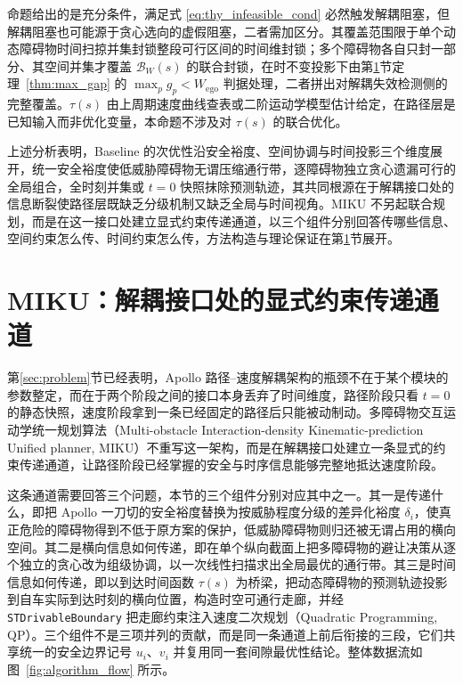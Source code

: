 \documentclass[a4paper,zihao=5]{ctexart}
\theoremstyle{definition}
\begin{document}
命题给出的是充分条件，满足式 \eqref{eq:thy_infeasible_cond} 必然触发解耦阻塞，但解耦阻塞也可能源于贪心选向的虚假阻塞，二者需加区分。其覆盖范围限于单个动态障碍物时间扫掠并集封锁整段可行区间的时间维封锁；多个障碍物各自只封一部分、其空间并集才覆盖 $\mathcal{B}_{W}(s)$ 的联合封锁，在时不变投影下由第\ref{sec:method}节定理~\ref{thm:max_gap} 的 $\max_p g_p < W_{\text{ego}}$ 判据处理，二者拼出对解耦失效检测侧的完整覆盖。$\tau(s)$ 由上周期速度曲线查表或二阶运动学模型估计给定，在路径层是已知输入而非优化变量，本命题不涉及对 $\tau(s)$ 的联合优化。

上述分析表明，Baseline 的次优性沿安全裕度、空间协调与时间投影三个维度展开，统一安全裕度使低威胁障碍物无谓压缩通行带，逐障碍物独立贪心遗漏可行的全局组合，全时刻并集或 $t{=}0$ 快照抹除预测轨迹，其共同根源在于解耦接口处的信息断裂使路径层既缺乏分级机制又缺乏全局与时间视角。MIKU 不另起联合规划，而是在这一接口处建立显式约束传递通道，以三个组件分别回答传哪些信息、空间约束怎么传、时间约束怎么传，方法构造与理论保证在第\ref{sec:method}节展开。

\section{MIKU：解耦接口处的显式约束传递通道}
\label{sec:method}

第\ref{sec:problem}节已经表明，Apollo 路径--速度解耦架构的瓶颈不在于某个模块的参数整定，而在于两个阶段之间的接口本身丢弃了时间维度，路径阶段只看 $t=0$ 的静态快照，速度阶段拿到一条已经固定的路径后只能被动制动。多障碍物交互运动学统一规划算法（Multi-obstacle Interaction-density Kinematic-prediction Unified planner, MIKU）不重写这一架构，而是在解耦接口处建立一条显式的约束传递通道，让路径阶段已经掌握的安全与时序信息能够完整地抵达速度阶段。

这条通道需要回答三个问题，本节的三个组件分别对应其中之一。其一是传递什么，即把 Apollo 一刀切的安全裕度替换为按威胁程度分级的差异化裕度 $\delta_i$，使真正危险的障碍物得到不低于原方案的保护，低威胁障碍物则归还被无谓占用的横向空间。其二是横向信息如何传递，即在单个纵向截面上把多障碍物的避让决策从逐个独立的贪心改为组级协调，以一次线性扫描求出全局最优的通行带。其三是时间信息如何传递，即以到达时间函数 $\tau(s)$ 为桥梁，把动态障碍物的预测轨迹投影到自车实际到达时刻的横向位置，构造时空可通行走廊，并经 \texttt{STDrivableBoundary} 把走廊约束注入速度二次规划（Quadratic Programming, QP）。三个组件不是三项并列的贡献，而是同一条通道上前后衔接的三段，它们共享统一的安全边界记号 $u_i$、$v_i$ 并复用同一套间隙最优性结论。整体数据流如图~\ref{fig:algorithm_flow} 所示。
\end{document}
